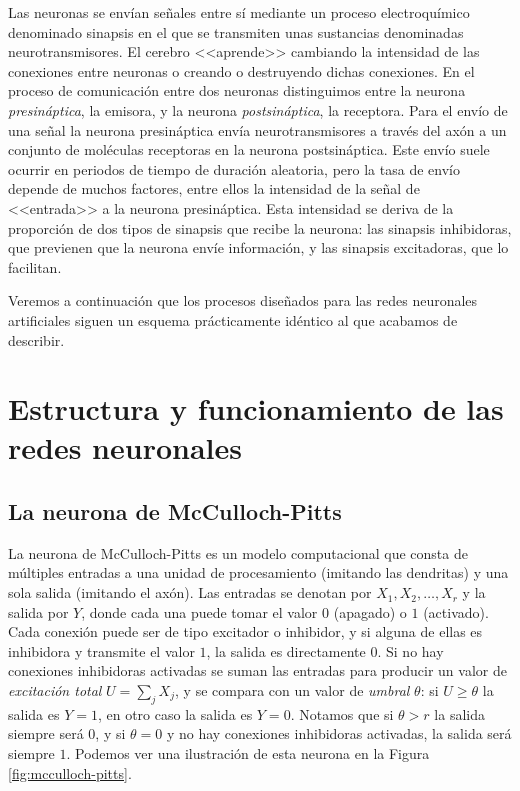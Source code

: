 \documentclass[
  a4paper,
  12pt,
  spanish,
]{scrartcl}
\theoremstyle{teorema-style}
\begin{document}
Las neuronas se envían señales entre sí mediante un proceso electroquímico denominado sinapsis en el que se transmiten unas sustancias denominadas neurotransmisores.
El cerebro <<aprende>> cambiando la intensidad de las conexiones entre neuronas o creando o destruyendo dichas conexiones.
En el proceso de comunicación entre dos neuronas distinguimos entre la neurona \textit{presináptica}, la emisora, y la neurona \textit{postsináptica}, la receptora.
Para el envío de una señal la neurona presináptica envía neurotransmisores a través del axón a un conjunto de moléculas receptoras en la neurona postsináptica.
Este envío suele ocurrir en periodos de tiempo de duración aleatoria, pero la tasa de envío depende de muchos factores, entre ellos la intensidad de la señal de <<entrada>> a la neurona presináptica.
Esta intensidad se deriva de la proporción de dos tipos de sinapsis que recibe la neurona: las sinapsis inhibidoras, que previenen que la neurona envíe información, y las sinapsis excitadoras, que lo facilitan.

Veremos a continuación que los procesos diseñados para las redes neuronales artificiales siguen un esquema prácticamente idéntico al que acabamos de describir.

\section{Estructura y funcionamiento de las redes neuronales}
\label{sec:estructura}

\subsection{La neurona de McCulloch-Pitts}

La neurona de McCulloch-Pitts \parencite{mcculloch_logical_1943} es un modelo computacional que consta de múltiples entradas a una unidad de procesamiento (imitando las dendritas) y una sola salida (imitando el axón). Las entradas se denotan por $X_1,X_2,\dots, X_r$ y la salida por $Y$, donde cada una puede tomar el valor $0$ (apagado) o $1$ (activado). Cada conexión puede ser de tipo excitador o inhibidor, y si alguna de ellas es inhibidora y transmite el valor $1$, la salida es directamente $0$. Si no hay conexiones inhibidoras activadas se suman las entradas para producir un valor de \textit{excitación total} $U = \sum_{j} X_j$, y se compara con un valor de \textit{umbral} $\theta$: si $U \ge \theta$ la salida es $Y=1$, en otro caso la salida es $Y=0$. Notamos que si $\theta > r$ la salida siempre será $0$, y si $\theta = 0$ y no hay conexiones inhibidoras activadas, la salida será siempre $1$. Podemos ver una ilustración de esta neurona en la Figura \ref{fig:mcculloch-pitts}.
\end{document}
